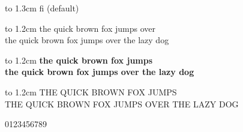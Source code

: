 \documentclass[10pt]{article}
\begin{document}
\vbox to 1.3cm{ %
{\LARGE fi} (default)\\
}

\vbox to 1.2cm{
the quick brown fox jumps over\\
\hminfamily the quick brown fox jumps over the lazy dog
}

\vbox to 1.2cm{
\bfseries the quick brown fox jumps\\
\hminfamily \bfseries the quick brown fox jumps over the lazy dog
}

\vbox to 1.2cm{
THE QUICK BROWN FOX JUMPS\\
\hminfamily THE QUICK BROWN FOX JUMPS OVER THE LAZY DOG
}

\vbox{
0123456789 
}
\end{document}
